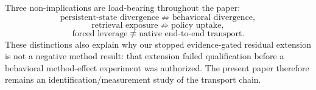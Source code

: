 Three non-implications are load-bearing throughout the paper:
\[
  \text{persistent-state divergence}\not\Rightarrow\text{behavioral divergence},
\]
\[
  \text{retrieval exposure}\not\Rightarrow\text{policy uptake},
\]
\[
  \text{forced leverage}\not\equiv\text{native end-to-end transport}.
\]
These distinctions also explain why our stopped evidence-gated residual extension is not a negative method result: that extension failed qualification before a behavioral method-effect experiment was authorized. The present paper therefore remains an identification/measurement study of the transport chain.
